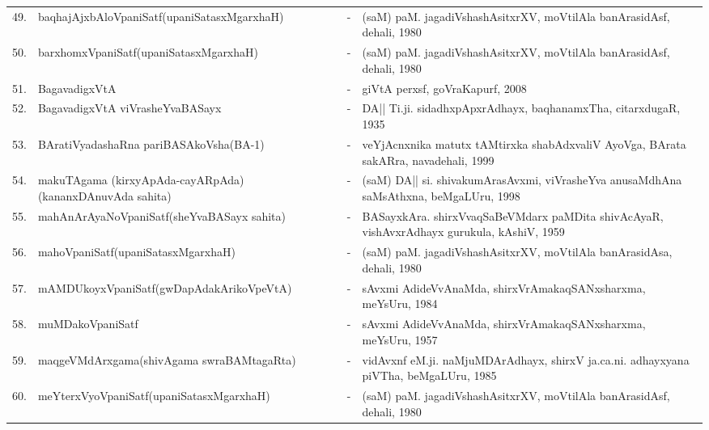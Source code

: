 {\begin{longtable}{rp{6cm}cp{9cm}<{\raggedright}}
49. & baqhajAjxbAloVpaniSatf\newline (upaniSatasxMgarxhaH) &-& (saM) paM. jagadiVshashAsitxrXV, moVtilAla banArasidAsf, dehali, 1980\\
50. & barxhomxVpaniSatf\newline (upaniSatasxMgarxhaH) &-& (saM) paM. jagadiVshashAsitxrXV, moVtilAla banArasidAsf, dehali, 1980\\
51. & BagavadigxVtA &-& giVtA perxsf, goVraKapurf, 2008\\
52. & BagavadigxVtA viVrasheYvaBASayx &-& DA|| Ti.ji. sidadhxpApxrAdhayx, baqhanamxTha, citarxdugaR, 1935\\
53. & BAratiVyadashaRna pariBASAkoVsha\newline (BA-1) &-& veYjAcnxnika matutx tAMtirxka shabAdxvaliV AyoVga, BArata sakARra, navadehali, 1999\\
54. & makuTAgama (kirxyApAda-cayARpAda)\newline (kananxDAnuvAda sahita) &-& (saM) DA|| si. shivakumArasAvxmi, viVrasheYva anusaMdhAna saMsAthxna, beMgaLUru, 1998\\
55. & mahAnArAyaNoVpaniSatf\newline (sheYvaBASayx sahita) &-& BASayxkAra. shirxVvaqSaBeVMdarx paMDita shivAcAyaR, vishAvxrAdhayx gurukula, kAshiV, 1959\\
56. & mahoVpaniSatf\newline (upaniSatasxMgarxhaH) &-& (saM) paM. jagadiVshashAsitxrXV, moVtilAla banArasidAsa, dehali, 1980\\
57. & mAMDUkoyxVpaniSatf\newline (gwDapAdakArikoVpeVtA) &-& sAvxmi AdideVvAnaMda, shirxVrAmakaqSANxsharxma, meYsUru, 1984\\
58. & muMDakoVpaniSatf &-& sAvxmi AdideVvAnaMda, shirxVrAmakaqSANxsharxma, meYsUru, 1957\\
59. & maqgeVMdArxgama\newline (shivAgama swraBAMtagaRta) &-& vidAvxnf eM.ji. naMjuMDArAdhayx, shirxV ja.ca.ni. adhayxyana piVTha, beMgaLUru, 1985\\
60. & meYterxVyoVpaniSatf\newline (upaniSatasxMgarxhaH) &-& (saM) paM. jagadiVshashAsitxrXV, moVtilAla banArasidAsf, dehali, 1980\\

\end{longtable}}

